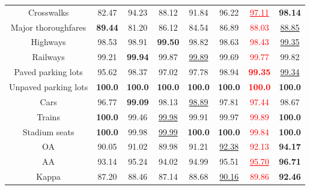 \begin{table}
{\begin{tabular}{c|ccccccc}
  Crosswalks                   & 82.47 & 94.23 & 88.12 & 91.84 & 96.22 & \textcolor{red}{\underline{97.11}} & \cellcolor{bg} \textbf{98.14} \\
  Major thoroughfares          & \textbf{89.44} & 81.20 & 86.12 & 84.54 & 86.89 & \textcolor{red}{88.03} & \cellcolor{bg} \underline{88.85} \\
  Highways                     & 98.53 & 98.91 & \textbf{99.50} & 98.82 & 98.63 & \textcolor{red}{98.43} & \cellcolor{bg} \underline{99.35} \\
  Railways                     & 99.21 & \textbf{99.94} & 99.87 & \underline{99.89} & 99.69 & \textcolor{red}{99.77} & \cellcolor{bg} 99.82 \\
  Paved parking lots           & 95.62 & 98.37 & 97.02 & 97.78 & 98.94 & \textcolor{red}{\textbf{99.35}} & \cellcolor{bg}\underline{99.34} \\
  Unpaved parking lots         & \textbf{100.0}   & \textbf{100.0}   & \textbf{100.0} & \textbf{100.0} & \textbf{100.0} & \textcolor{red}{\textbf{100.0}} & \cellcolor{bg}\textbf{100.0} \\
  Cars                         & 96.77 & \textbf{99.09} & 98.13 & \underline{98.89} & 97.81 & \textcolor{red}{97.44} & \cellcolor{bg}98.67 \\
  Trains                       & \textbf{100.0}   & 99.46 & \underline{99.98} & 99.91 & 99.97 & \textcolor{red}{99.89} & \cellcolor{bg}\textbf{100.0} \\
  Stadium seats                & \textbf{100.0}   & 99.98 & \underline{99.99} & \textbf{100.0} & \textbf{100.0} & \textcolor{red}{99.84} & \cellcolor{bg}\textbf{100.0} \\
  \midrule
  OA                           & 90.05 & 91.02 & 89.98 & 91.21 & \underline{92.38} & \textcolor{red}{92.13} & \cellcolor{bg}\textbf{94.17} \\
  AA                           & 93.14 & 95.24 & 94.02 & 94.99 & 95.51 & \textcolor{red}{\underline{95.70}} & \cellcolor{bg}\textbf{96.71} \\
  Kappa                        & 87.20 & 88.46 & 87.14 & 88.68 & \underline{90.16} & \textcolor{red}{89.86} & \cellcolor{bg}\textbf{92.46} \\
  \bottomrule\hline
  \end{tabular}}
  \label{table_houston2018}
\end{table}

